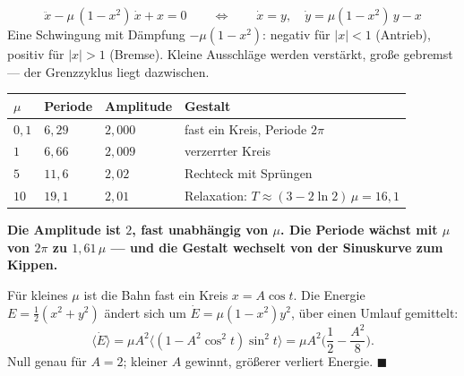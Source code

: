 \begin{merksatz}
\[ \ddot x - \mu\,(1-x^{2})\,\dot x + x = 0 \qquad\Longleftrightarrow\qquad \dot x = y, \quad \dot y = \mu(1-x^{2})\,y - x \]
Eine Schwingung mit Dämpfung $-\mu(1-x^{2})$: negativ für $|x|<1$ (Antrieb), positiv für $|x|>1$ (Bremse). Kleine Ausschläge werden verstärkt, große gebremst --- der Grenzzyklus liegt dazwischen.

\begin{center}
{\small
\renewcommand{\arraystretch}{1.48}
\begin{tabular}{@{}P{1.2cm}P{2.0cm}P{2.0cm}P{3.2cm}@{}}
\toprule
$\mu$ & \textbf{Periode} & \textbf{Amplitude} & \textbf{Gestalt}\\
\midrule
$0{,}1$ & $6{,}29$ & $2{,}000$ & fast ein Kreis, Periode $2\pi$\\
$1$ & $6{,}66$ & $2{,}009$ & verzerrter Kreis\\
$5$ & $11{,}6$ & $2{,}02$ & Rechteck mit Sprüngen\\
$10$ & $19{,}1$ & $2{,}01$ & Relaxation: $T\approx(3-2\ln2)\,\mu = 16{,}1$\\
\bottomrule
\end{tabular}}
\end{center}

\begin{center}
\begin{minipage}{0.9\textwidth}
\textbf{Die Amplitude ist $2$, fast unabhängig von $\mu$. Die Periode wächst mit $\mu$ von $2\pi$ zu $1{,}61\,\mu$ --- und die Gestalt wechselt von der Sinuskurve zum Kippen.}
\end{minipage}
\end{center}

Für kleines $\mu$ ist die Bahn fast ein Kreis $x = A\cos t$. Die Energie $E = \tfrac12(x^{2}+y^{2})$ ändert sich um $\dot E = \mu(1-x^{2})y^{2}$, über einen Umlauf gemittelt:
\[ \langle\dot E\rangle = \mu A^{2}\big\langle(1-A^{2}\cos^{2}t)\sin^{2}t\big\rangle = \mu A^{2}\Big(\frac12 - \frac{A^{2}}{8}\Big) . \]
Null genau für $A = 2$; kleiner $A$ gewinnt, größerer verliert Energie. $\blacksquare$

\begin{center}
\begin{minipage}{0.88\textwidth}
\end{minipage}
\end{center}
\end{merksatz}

